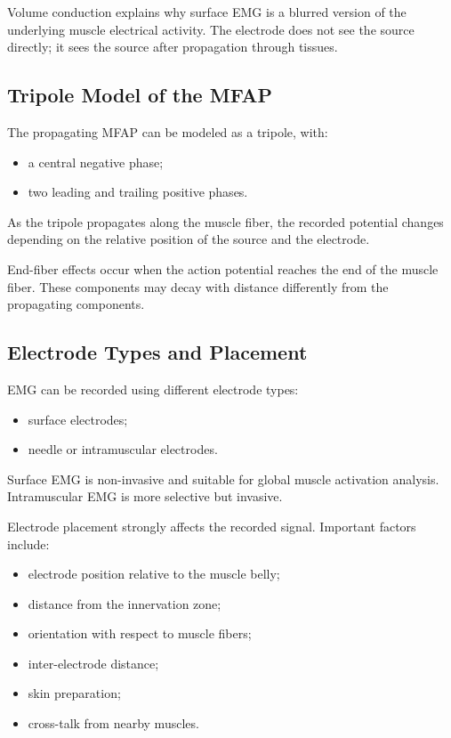 \begin{authornote}
Volume conduction explains why surface EMG is a blurred version of the underlying muscle electrical activity. The electrode does not see the source directly; it sees the source after propagation through tissues.
\end{authornote}

\subsection{Tripole Model of the MFAP}

The propagating MFAP can be modeled as a tripole, with:

\begin{itemize}[noitemsep]
    \item a central negative phase;
    \item two leading and trailing positive phases.
\end{itemize}

As the tripole propagates along the muscle fiber, the recorded potential changes depending on the relative position of the source and the electrode.

End-fiber effects occur when the action potential reaches the end of the muscle fiber. These components may decay with distance differently from the propagating components.

\subsection{Electrode Types and Placement}

EMG can be recorded using different electrode types:

\begin{itemize}[noitemsep]
    \item surface electrodes;
    \item needle or intramuscular electrodes.
\end{itemize}

Surface EMG is non-invasive and suitable for global muscle activation analysis. Intramuscular EMG is more selective but invasive.

Electrode placement strongly affects the recorded signal. Important factors include:

\begin{itemize}[noitemsep]
    \item electrode position relative to the muscle belly;
    \item distance from the innervation zone;
    \item orientation with respect to muscle fibers;
    \item inter-electrode distance;
    \item skin preparation;
    \item cross-talk from nearby muscles.
\end{itemize}

